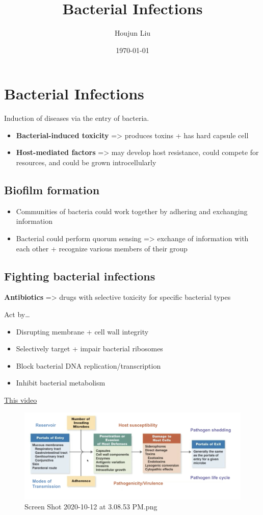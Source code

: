 \documentclass[letterpaper]{article}
\author{Houjun Liu}
\date{\today}
\title{Bacterial Infections}
\renewcommand\maketitle{}
\begin{document}
\maketitle


\section{Bacterial Infections}
\label{sec:org6fbd110}
Induction of diseases via the entry of bacteria.

\begin{itemize}
\item \textbf{Bacterial-induced toxicity} => produces toxins + has hard capsule
cell
\item \textbf{Host-mediated factors} => may develop host resistance, could compete
for resources, and could be grown introcellularly
\end{itemize}

\subsection{Biofilm formation}
\label{sec:orgc5b8d8c}
\begin{itemize}
\item Communities of bacteria could work together by adhering and exchanging
information
\item Bacterial could perform quorum sensing => exchange of information with
each other + recognize various members of their group
\end{itemize}

\subsection{Fighting bacterial infections}
\label{sec:orgbee9dfd}
\textbf{Antibiotics} => drugs with selective toxicity for specific bacterial
types

Act by\ldots{}

\begin{itemize}
\item Disrupting membrane + cell wall integrity
\item Selectively target + impair bacterial ribosomes
\item Block bacterial DNA replication/transcription
\item Inhibit bacterial metabolism
\end{itemize}

\href{https://drive.google.com/file/d/1WRnbgkhnmRrdP4ZqlqT3HHBD1\_eW9qib/view}{This
video}

\begin{figure}[htbp]
\centering
\includegraphics[width=.9\linewidth]{Screen Shot 2020-10-12 at 3.08.53 PM.png}
\caption{Screen Shot 2020-10-12 at 3.08.53 PM.png}
\end{figure}
\end{document}
